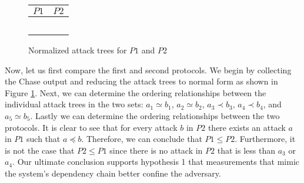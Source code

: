 \documentclass[runningheads]{llncs}
\theoremstyle{definition}
\begin{document}
\begin{figure}[h]
    \begin{center}
        \begin{tabular}{ M{6cm} | M{6cm} }
                $P1$ & $P2$ \\
                \hline
                &\\ 
                 \hspace{.03cm}  
                &  \hspace{.03cm}  \\ 
                &\\
                 \hspace{.03cm}  
                &    \\
                 
                 &  \\ 
            \end{tabular}
    \end{center}
    \caption{Normalized attack trees for $P1$ and $P2$}
    \label{fig:rtm-compare-reduced}
\end{figure}

Now, let us first compare the first and second protocols. We begin by collecting the Chase output and reducing the attack trees to normal form as shown in Figure \ref{fig:rtm-compare-reduced}. Next, we can determine the ordering relationships between the individual attack trees in the two sets: $a_1 \simeq b_1$, $a_2 \simeq b_2$, $a_3 \prec b_3$, $a_4 \prec b_4$, and $a_5 \simeq b_5$. Lastly we can determine the ordering relationships between the two protocols. It is clear to see that for every attack $b$ in $P2$ there exists an attack $a$ in $P1$ such that $a \preceq b$. Therefore, we can conclude that $P1 \leq P2$. Furthermore, it is not the case that $P2 \leq P1$ since there is no attack in $P2$ that is less than $a_3$ or $a_4$. Our ultimate conclusion supports hypothesis 1 that measurements that mimic the system's dependency chain better confine the adversary.
\end{document}
